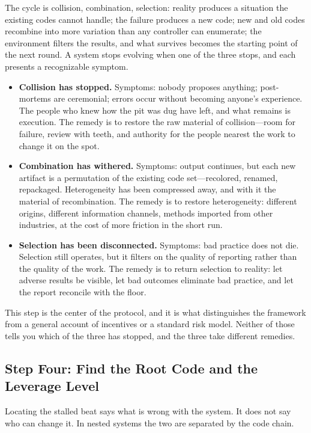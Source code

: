\documentclass[11pt,a4paper]{article}
\begin{document}
The cycle is collision, combination, selection: reality produces a situation the existing codes cannot handle; the failure produces a new code; new and old codes recombine into more variation than any controller can enumerate; the environment filters the results, and what survives becomes the starting point of the next round. A system stops evolving when one of the three stops, and each presents a recognizable symptom.

\begin{itemize}
    \item \textbf{Collision has stopped.} Symptoms: nobody proposes anything; post-mortems are ceremonial; errors occur without becoming anyone's experience. The people who knew how the pit was dug have left, and what remains is execution. The remedy is to restore the raw material of collision---room for failure, review with teeth, and authority for the people nearest the work to change it on the spot.
    \item \textbf{Combination has withered.} Symptoms: output continues, but each new artifact is a permutation of the existing code set---recolored, renamed, repackaged. Heterogeneity has been compressed away, and with it the material of recombination. The remedy is to restore heterogeneity: different origins, different information channels, methods imported from other industries, at the cost of more friction in the short run.
    \item \textbf{Selection has been disconnected.} Symptoms: bad practice does not die. Selection still operates, but it filters on the quality of reporting rather than the quality of the work. The remedy is to return selection to reality: let adverse results be visible, let bad outcomes eliminate bad practice, and let the report reconcile with the floor.
\end{itemize}

This step is the center of the protocol, and it is what distinguishes the framework from a general account of incentives or a standard risk model. Neither of those tells you which of the three has stopped, and the three take different remedies.

\subsection{Step Four: Find the Root Code and the Leverage Level}

Locating the stalled beat says what is wrong with the system. It does not say who can change it. In nested systems the two are separated by the code chain.
\end{document}
